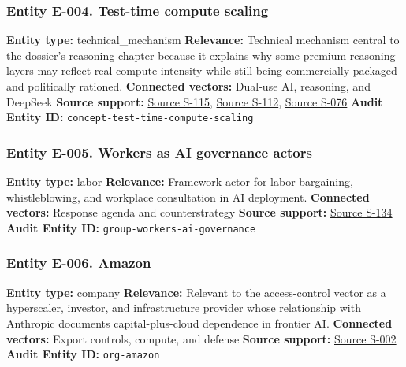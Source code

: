 \documentclass[
  american,
  11pt,
  letterpaper,
]{article}
\begin{document}
\subsubsection{Entity E-004. Test-time compute
scaling}\label{entity-e-004-test-time-compute-scaling}

\textbf{Entity type:} technical\_mechanism \textbf{Relevance:} Technical
mechanism central to the dossier's reasoning chapter because it explains
why some premium reasoning layers may reflect real compute intensity
while still being commercially packaged and politically rationed.
\textbf{Connected vectors:} Dual-use AI, reasoning, and DeepSeek
\textbf{Source support:}
\hyperref[source-s-115-scaling-llm-test-time-compute-optimally-can-be-more-effective-than-scaling-model-parameters]{Source
S-115}, \hyperref[source-s-112-s1-simple-test-time-scaling]{Source
S-112},
\hyperref[source-s-076-it-s-not-that-simple-an-analysis-of-simple-test-time-scaling]{Source
S-076} \textbf{Audit Entity ID:}
\texttt{concept-test-time-compute-scaling}

\subsubsection{Entity E-005. Workers as AI governance
actors}\label{entity-e-005-workers-as-ai-governance-actors}

\textbf{Entity type:} labor \textbf{Relevance:} Framework actor for
labor bargaining, whistleblowing, and workplace consultation in AI
deployment. \textbf{Connected vectors:} Response agenda and
counterstrategy \textbf{Source support:}
\hyperref[source-s-134-in-oxford-handbook-on-ai-governance-the-role-of-workers-in-ai-ethics-and-governance]{Source
S-134} \textbf{Audit Entity ID:} \texttt{group-workers-ai-governance}

\subsubsection{Entity E-006. Amazon}\label{entity-e-006-amazon}

\textbf{Entity type:} company \textbf{Relevance:} Relevant to the
access-control vector as a hyperscaler, investor, and infrastructure
provider whose relationship with Anthropic documents capital-plus-cloud
dependence in frontier AI. \textbf{Connected vectors:} Export controls,
compute, and defense \textbf{Source support:}
\hyperref[source-s-002-amazon-and-anthropic-announce-strategic-collaboration-to-advance-generative-ai]{Source
S-002} \textbf{Audit Entity ID:} \texttt{org-amazon}
\end{document}
